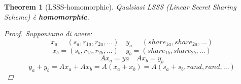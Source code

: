 \documentclass{book}
\newtheorem{theorem}{Theorem}[section]
\begin{document}
\begin{theorem}[LSSS-homomorphic]
    Qualsiasi LSSS (Linear Secret Sharing Scheme) è \textbf{homomorphic}.
    \begin{proof}
        Supponiamo di avere:\begin{equation*}
            x_{a}=(s_{a},r_{1a},r_{2a},\ldots)\quad y_{a}=(share_{1a},share_{2a},\ldots)
        \end{equation*}
        \begin{equation*}
            x_{b}=(s_{b},r_{1b},r_{2b},\ldots)\quad y_{b}=(share_{1b},share_{2b},\ldots)
        \end{equation*}
        \begin{equation*}
            Ax_{a}=y{a}\quad Ax_{b}=y_{b}
        \end{equation*}
        \begin{equation*}
            y_{a}+y_{b}=Ax_{a}+Ax_{b}=A(x_{a}+x_{b})=A(s_{a}+s_{b},rand,rand,\ldots)
        \end{equation*}
    \end{proof}
\end{theorem}
\end{document}
